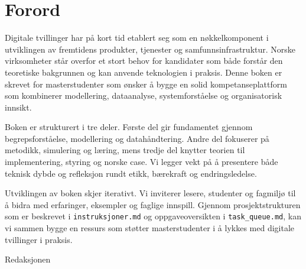 \chapter*{Forord}

Digitale tvillinger har på kort tid etablert seg som en nøkkelkomponent i utviklingen av fremtidens produkter, tjenester og samfunnsinfrastruktur. Norske virksomheter står overfor et stort behov for kandidater som både forstår den teoretiske bakgrunnen og kan anvende teknologien i praksis. Denne boken er skrevet for masterstudenter som ønsker å bygge en solid kompetanseplattform som kombinerer modellering, dataanalyse, systemforståelse og organisatorisk innsikt.

Boken er strukturert i tre deler. Første del gir fundamentet gjennom begrepsforståelse, modellering og datahåndtering. Andre del fokuserer på metodikk, simulering og læring, mens tredje del knytter teorien til implementering, styring og norske case. Vi legger vekt på å presentere både teknisk dybde og refleksjon rundt etikk, bærekraft og endringsledelse.

Utviklingen av boken skjer iterativt. Vi inviterer lesere, studenter og fagmiljø til å bidra med erfaringer, eksempler og faglige innspill. Gjennom prosjektstrukturen som er beskrevet i \texttt{instruksjoner.md} og oppgaveoversikten i \texttt{task_queue.md}, kan vi sammen bygge en ressurs som støtter masterstudenter i å lykkes med digitale tvillinger i praksis.

\bigskip
\begin{flushright}
Redaksjonen
\end{flushright}

